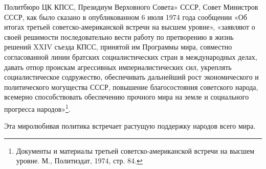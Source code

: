 \documentclass[12pt, a4paper, openany]{book}
\begin{document}
	Политбюро ЦК КПСС, Президиум Верховного Совета» СССР, Совет Министров СССР, как было сказано в опубликованном 6 июля 1974 года сообщении «Об итогах третьей советско-американской встречи на высшем уровне», «заявляют о своей решимости последовательно вести работу по претворению в жизнь решений XXIV съезда КПСС, принятой им Программы мира, совместно согласованной линии братских социалистических стран в международных делах, давать отпор проискам агрессивных империалистических сил, укреплять социалистическое содружество, обеспечивать дальнейший рост экономического и политического могущества СССР, повышение благосостояния советского народа, всемерно способствовать обеспечению прочного мира на земле и социального прогресса народов»{\footnote{Документы и материалы третьей советско-американской встречи на высшем уровне. М., Политиздат, 1974, стр. 84.}}. 
	
	Эта миролюбивая политика встречает растущую поддержку народов всего мира.
	
	
	\newpage
	\tableofcontents
	
	\thispagestyle{empty} %
	
		\newpage
	
	\setcounter{secnumdepth}{0}  
	
\end{document}
